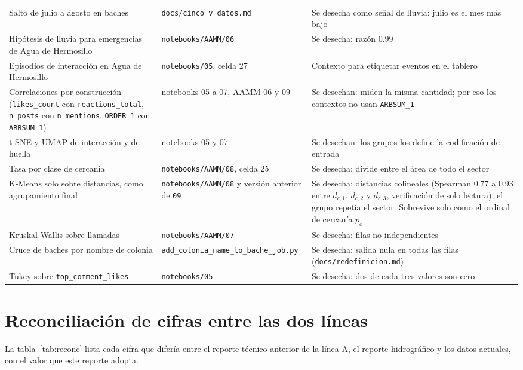 \documentclass[11pt]{article}
\newcommand{\cod}[1]{\nolinkurl{#1}}
\begin{document}
\begin{table}[!htbp]
\begin{tabularx}{\textwidth}{L{4.4cm} L{3.4cm} Y}
    Salto de julio a agosto en baches & \cod{docs/cinco_v_datos.md} & Se desecha como señal de lluvia: julio es el mes más bajo \\
    Hipótesis de lluvia para emergencias de Agua de Hermosillo & \cod{notebooks/AAMM/06} & Se desecha: razón 0.99 \\
    Episodios de interacción en Agua de Hermosillo & \cod{notebooks/05}, celda 27 & Contexto para etiquetar eventos en el tablero \\
    Correlaciones por construcción (\cod{likes_count} con \cod{reactions_total}, \cod{n_posts} con \cod{n_mentions}, \cod{ORDER_1} con \cod{ARBSUM_1}) & notebooks 05 a 07, AAMM 06 y 09 & Se desechan: miden la misma cantidad; por eso los contextos no usan \cod{ARBSUM_1} \\
    t-SNE y UMAP de interacción y de huella & notebooks 05 y 07 & Se desechan: los grupos los define la codificación de entrada \\
    Tasa por clase de cercanía & \cod{notebooks/AAMM/08}, celda 25 & Se desecha: divide entre el área de todo el sector \\
    K-Means solo sobre distancias, como agrupamiento final & \cod{notebooks/AAMM/08} y versión anterior de \cod{09} & Se desecha: distancias colineales (Spearman 0.77 a 0.93 entre $d_{c,1}$, $d_{c,2}$ y $d_{c,3}$, verificación de solo lectura); el grupo repetía el sector. Sobrevive solo como el ordinal de cercanía $p_c$ \\
    Kruskal-Wallis sobre llamadas & \cod{notebooks/AAMM/07} & Se desecha: filas no independientes \\
    Cruce de baches por nombre de colonia & \cod{add_colonia_name_to_bache_job.py} & Se desecha: salida nula en todas las filas (\cod{docs/redefinicion.md}) \\
    Tukey sobre \cod{top_comment_likes} & \cod{notebooks/05} & Se desecha: dos de cada tres valores son cero \\
    \bottomrule
  \end{tabularx}
\end{table}

\section{Reconciliación de cifras entre las dos líneas}
\label{sec:reconc}

La tabla~\ref{tab:reconc} lista cada cifra que difería entre el reporte técnico anterior de la línea A, el reporte hidrográfico y los datos actuales, con el valor que este reporte adopta.
\end{document}
